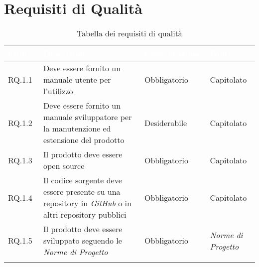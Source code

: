 \section{Requisiti di Qualità}
\begin{center}
  \centering
  \begin{longtable}{|L{1,5cm}|C{5,5cm}|C{3cm}|C{2cm}|}
    \hline
    \textcolor[HTML]{FFFFFF}{\textbf{Codice}} & \textcolor[HTML]{FFFFFF}{\textbf{Descrizione}} & \textcolor[HTML]{FFFFFF}{\textbf{Classificazione}} & \textcolor[HTML]{FFFFFF}{\textbf{Fonti}}
    \\ \hline
    RQ.1.1 & Deve essere fornito un manuale utente per l'utilizzo & Obbligatorio & Capitolato \\ \hline
    RQ.1.2 & Deve essere fornito un manuale sviluppatore per la manutenzione ed estensione del prodotto & Desiderabile & Capitolato \\ \hline
    RQ.1.3 & Il prodotto deve essere open source & Obbligatorio & Capitolato \\ \hline
    RQ.1.4 & Il codice sorgente deve essere presente su una repository in \textit{GitHub} o in altri repository pubblici & Obbligatorio & Capitolato \\ \hline
    RQ.1.5 & Il prodotto deve essere sviluppato seguendo le \textit{Norme di Progetto} & Obbligatorio & \textit{Norme di Progetto} \\ \hline

    \caption{Tabella dei requisiti di qualità}
  \end{longtable}
\end{center}


